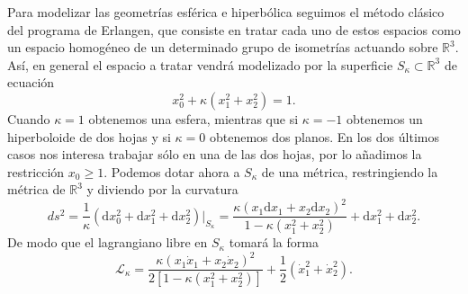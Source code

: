 \documentclass[12pt,a4paper,twoside]{article}
\theoremstyle{definition} \newtheorem{defn}[thm]{Definición}
\theoremstyle{definition} \newtheorem{ejemplo}[thm]{Ejemplo}
\theoremstyle{definition} \newtheorem{ejercicio}[thm]{Ejercicio}
\theoremstyle{remark} \newtheorem*{obs}{Observación}
\def\dd{\mathrm{d}}
\begin{document}
Para modelizar las geometrías esférica e hiperbólica seguimos el método clásico del programa de Erlangen, que consiste en tratar cada uno de estos espacios como un espacio homogéneo de un determinado grupo de isometrías actuando sobre $\mathbb{R}^3$. Así, en general el espacio a tratar vendrá modelizado por la superficie $S_\kappa \subset \mathbb{R} ^3$ de ecuación
\begin{equation}
 x_0^2+\kappa(x_1^2+x_2^2)=1. 
\end{equation}
Cuando $\kappa=1$ obtenemos una esfera, mientras que si $\kappa=-1$ obtenemos un hiperboloide de dos hojas y si $\kappa=0$ obtenemos dos planos. En los dos últimos casos nos interesa trabajar sólo en una de las dos hojas, por lo añadimos la restricción $x_0\geq 1$. Podemos dotar ahora a $S_\kappa$ de una métrica, restringiendo la métrica de $\mathbb{R} ^3$ y diviendo por la curvatura
\begin{equation}
  ds^2=\frac{1}{\kappa}(\dd x_0^2 +  \dd x_1^2 + \dd x_2^2)|_{S_\kappa}=\frac{\kappa (x_1\dd x_1+x_2 \dd x_2)^2}{1-\kappa(x_1^2+x_2^2)}+\dd x_1^2 + \dd x_2 ^2.
\end{equation}
De modo que el lagrangiano libre en $S_{\kappa}$ tomará la forma
\begin{equation}
  \mathcal{L} _\kappa=\frac{\kappa (x_1\dot{x}_1+x_2 \dot{x}_2)^2}{2[1-\kappa(x_1^2+x_2^2)]}+\frac{1}{2}(\dot{x}_1^2 + \dot{x}_2 ^2).
\end{equation}
\end{document}
